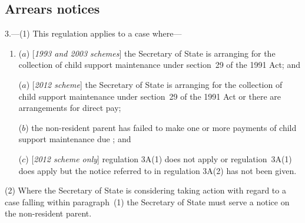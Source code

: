 \documentclass[12pt,a4paper]{article}
\begin{document}

\subsection[3. Arrears notices]{Arrears notices}

3.---(1)  This regulation applies to a case where—
\begin{enumerate}\item[]
($a$) [\emph{1993 and 2003 schemes}] the 
Secretary of State  %
is arranging for the collection of child support maintenance under section~29 of the 1991 Act; and

($a$) [\emph{2012 scheme}] the 
Secretary of State  %
is arranging for the collection of child support maintenance under section~29 of the 1991 Act
or there are arrangements for direct pay;  %

($b$) the non-resident parent has failed to make one or more payments of child support maintenance due%
% 
; and

($c$) [\emph{2012 scheme only}] regulation 3A(1) does not apply or regulation~3A(1) does apply but the notice referred to in regulation 3A(2) has not been given.
\end{enumerate}

(2) Where the 
Secretary of State  %
is considering taking action with regard to a case falling within paragraph~(1) 
the Secretary of State  %
must serve a notice on the non-resident parent.
\end{document}
